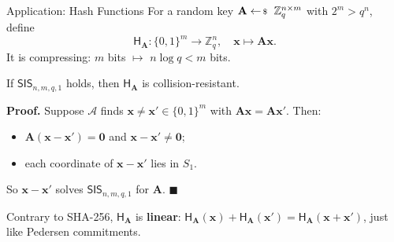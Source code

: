 \documentclass{zkdl-presentation-template}
\begin{document}
    \begin{frame}{Application: Hash Functions}
        For a random key $\mathbf{A} \leftarrowS \mathbb{Z}_q^{n \times m}$ with $2^m > q^n$, define
        \begin{equation*}
            \mathsf{H}_{\mathbf{A}}: \{0,1\}^m \to \mathbb{Z}_q^n, \quad \mathbf{x} \mapsto \mathbf{A}\mathbf{x}.
        \end{equation*}
        It is compressing: $m$ bits $\mapsto$ $n\log q < m$ bits.
        \pause

        \begin{proposition}
            If $\mathsf{SIS}_{n,m,q,1}$ holds, then $\mathsf{H}_{\mathbf{A}}$ is collision-resistant.
        \end{proposition}
        \pause

        \textbf{Proof.} Suppose $\mathcal{A}$ finds $\mathbf{x} \neq \mathbf{x}' \in \{0,1\}^m$ with $\mathbf{A}\mathbf{x} = \mathbf{A}\mathbf{x}'$. Then:
        \begin{itemize}
            \item $\mathbf{A}(\mathbf{x}-\mathbf{x}') = \mathbf{0}$ and $\mathbf{x}-\mathbf{x}' \neq \mathbf{0}$;
            \item each coordinate of $\mathbf{x}-\mathbf{x}'$ lies in $S_1$.
        \end{itemize}
        So $\mathbf{x}-\mathbf{x}'$ solves $\mathsf{SIS}_{n,m,q,1}$ for $\mathbf{A}$. \hfill $\blacksquare$
        \pause

        \begin{remark}
            Contrary to SHA-256, $\mathsf{H}_{\mathbf{A}}$ is \textbf{linear}: $\mathsf{H}_{\mathbf{A}}(\mathbf{x}) + \mathsf{H}_{\mathbf{A}}(\mathbf{x}') = \mathsf{H}_{\mathbf{A}}(\mathbf{x}+\mathbf{x}')$, just like Pedersen commitments.
        \end{remark}
    \end{frame}
\end{document}
